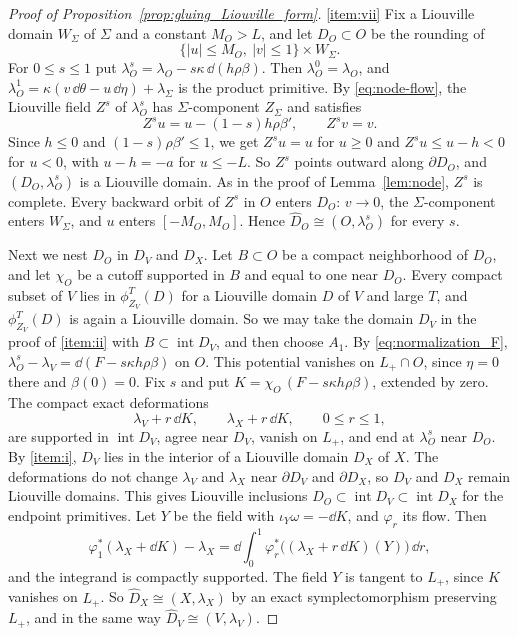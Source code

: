 \documentclass[12pt, letter]{amsart}
\theoremstyle{definition}
\begin{document}
\begin{proof}[Proof of Proposition~\ref{prop:gluing_Liouville_form}]
\ref{item:vii} Fix a Liouville domain $W_\Sigma$ of $\Sigma$ and a constant $M_O>L$, and let $D_O\subset O$ be the rounding of
\[
 \{|u|\le M_O,\ |v|\le1\}\times W_\Sigma .
\]
For $0\le s\le1$ put $\lambda_O^s=\lambda_O-s\kappa\,\dd(h\rho\beta)$.
Then $\lambda_O^0=\lambda_O$, and $\lambda_O^1=\kappa(v\,\dd\theta-u\,\dd\eta)+\lambda_\Sigma$ is the product primitive.
By \eqref{eq:node-flow}, the Liouville field $Z^s$ of $\lambda_O^s$ has $\Sigma$-component $Z_\Sigma$ and satisfies
\[
 Z^su=u-(1-s)h\rho\beta',\qquad Z^sv=v .
\]
Since $h\le0$ and $(1-s)\rho\beta'\le1$, we get $Z^su=u$ for $u\ge0$ and $Z^su\le u-h<0$ for $u<0$, with $u-h=-a$ for $u\le-L$.
So $Z^s$ points outward along $\partial D_O$, and $(D_O,\lambda_O^s)$ is a Liouville domain.
As in the proof of Lemma~\ref{lem:node}, $Z^s$ is complete.
Every backward orbit of $Z^s$ in $O$ enters $D_O$: $v\to0$, the $\Sigma$-component enters $W_\Sigma$, and $u$ enters $[-M_O,M_O]$.
Hence $\widehat D_O\cong(O,\lambda_O^s)$ for every $s$.

Next we nest $D_O$ in $D_V$ and $D_X$.
Let $B\subset O$ be a compact neighborhood of $D_O$, and let $\chi_O$ be a cutoff supported in $B$ and equal to one near $D_O$.
Every compact subset of $V$ lies in $\phi_{Z_V}^T(D)$ for a Liouville domain $D$ of $V$ and large $T$, and $\phi_{Z_V}^T(D)$ is again a Liouville domain.
So we may take the domain $D_V$ in the proof of \ref{item:ii} with $B\subset\operatorname{int}D_V$, and then choose $A_1$.
By \eqref{eq:normalization_F}, $\lambda_O^s-\lambda_V=\dd(F-s\kappa h\rho\beta)$ on $O$.
This potential vanishes on $L_+\cap O$, since $\eta=0$ there and $\beta(0)=0$.
Fix $s$ and put $K=\chi_O\,(F-s\kappa h\rho\beta)$, extended by zero.
The compact exact deformations
\[
 \lambda_V+r\,\dd K,\qquad \lambda_X+r\,\dd K,\qquad 0\le r\le1,
\]
are supported in $\operatorname{int}D_V$, agree near $D_V$, vanish on $L_+$, and end at $\lambda_O^s$ near $D_O$.
By \ref{item:i}, $D_V$ lies in the interior of a Liouville domain $D_X$ of $X$.
The deformations do not change $\lambda_V$ and $\lambda_X$ near $\partial D_V$ and $\partial D_X$, so $D_V$ and $D_X$ remain Liouville domains.
This gives Liouville inclusions $D_O\subset\operatorname{int}D_V\subset\operatorname{int}D_X$ for the endpoint primitives.
Let $Y$ be the field with $\iota_Y\omega=-\dd K$, and $\varphi_r$ its flow.
Then
\[
 \varphi_1^*(\lambda_X+\dd K)-\lambda_X=\dd\int_0^1\varphi_r^*\bigl((\lambda_X+r\,\dd K)(Y)\bigr)\,\dd r,
\]
and the integrand is compactly supported.
The field $Y$ is tangent to $L_+$, since $K$ vanishes on $L_+$.
So $\widehat D_X\cong(X,\lambda_X)$ by an exact symplectomorphism preserving $L_+$, and in the same way $\widehat D_V\cong(V,\lambda_V)$.


\end{proof}
\end{document}
